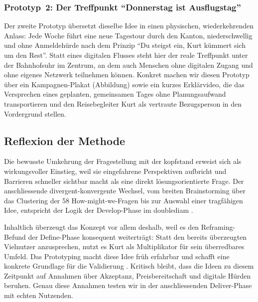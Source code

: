 \subsubsection{Prototyp~2: Der Treffpunkt \enquote{Donnerstag ist Ausflugstag}}
Der zweite Prototyp übersetzt dieselbe Idee in einen physischen, wiederkehrenden Anlass: Jede Woche führt eine neue Tagestour durch den Kanton, niederschwellig und ohne Anmeldehürde nach dem Prinzip \enquote{Du steigst ein, Kurt kümmert sich um den Rest}. Statt eines digitalen Flusses steht hier der reale Treffpunkt unter der Bahnhofsuhr im Zentrum, an dem auch Menschen ohne digitalen Zugang und ohne eigenes Netzwerk teilnehmen können. Konkret machen wir diesen Prototyp über ein Kampagnen-Plakat (Abbildung) sowie ein kurzes Erklärvideo, die das Versprechen eines geplanten, gemeinsamen Tages ohne Planungsaufwand transportieren und den Reisebegleiter Kurt als vertraute Bezugsperson in den Vordergrund stellen.


\subsection{Reflexion der Methode}

Die bewusste Umkehrung der Fragestellung mit der \gls{kopfstand} erweist sich als wirkungsvoller Einstieg, weil sie eingefahrene Perspektiven aufbricht und Barrieren schneller sichtbar macht als eine direkt lösungsorientierte Frage. Der anschliessende divergent-konvergente Wechsel, vom breiten Brainstorming über das Clustering der 58 How-might-we-Fragen bis zur Auswahl einer tragfähigen Idee, entspricht der Logik der Develop-Phase im \gls{doublediam} \parencite{designcouncil2005}.

Inhaltlich überzeugt das Konzept vor allem deshalb, weil es den Reframing-Befund der Define-Phase konsequent weiterträgt: Statt den bereits überzeugten Vielnutzer anzusprechen, nutzt es Kurt als Multiplikator für sein überredbares Umfeld. Das Prototyping macht diese Idee früh erfahrbar und schafft eine konkrete Grundlage für die Validierung \parencite{lewrick2018}. Kritisch bleibt, dass die Ideen zu diesem Zeitpunkt auf Annahmen über Akzeptanz, Preisbereitschaft und digitale Hürden beruhen. Genau diese Annahmen testen wir in der anschliessenden Deliver-Phase mit echten Nutzenden.
